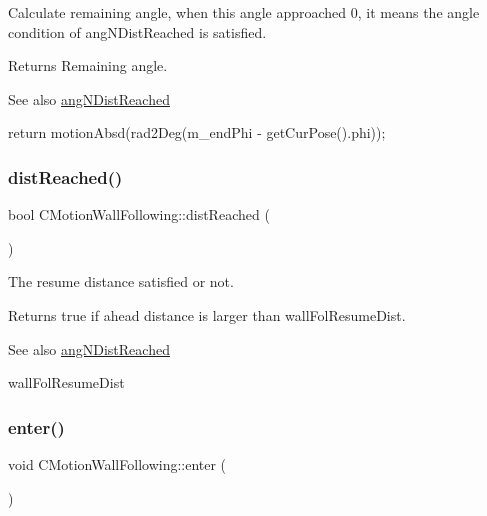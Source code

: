 Calculate remaining angle, when this angle approached 0, it means the angle condition of ang\+N\+Dist\+Reached is satisfied. \begin{DoxyReturn}{Returns}
Remaining angle. 
\end{DoxyReturn}
\begin{DoxySeeAlso}{See also}
\mbox{\hyperlink{classmotion_1_1CMotionWallFollowing_aa84fb18a4cea89ad726c18d4f308e4d7}{ang\+N\+Dist\+Reached}} 
\end{DoxySeeAlso}
return motion\+Absd(rad2\+Deg(m\+\_\+end\+Phi -\/ get\+Cur\+Pose().phi)); \mbox{\label{classmotion_1_1CMotionWallFollowing_a4fcea1525cdd043f8c0dd8621e3ba09e}} 
\subsubsection{\texorpdfstring{dist\+Reached()}{distReached()}}
{\footnotesize\ttfamily bool C\+Motion\+Wall\+Following\+::dist\+Reached (\begin{DoxyParamCaption}\item[{void}]{ }\end{DoxyParamCaption})}

The resume distance satisfied or not. \begin{DoxyReturn}{Returns}
true if ahead distance is larger than wall\+Fol\+Resume\+Dist. 
\end{DoxyReturn}
\begin{DoxySeeAlso}{See also}
\mbox{\hyperlink{classmotion_1_1CMotionWallFollowing_aa84fb18a4cea89ad726c18d4f308e4d7}{ang\+N\+Dist\+Reached}} 

wall\+Fol\+Resume\+Dist 
\end{DoxySeeAlso}
\mbox{\label{classmotion_1_1CMotionWallFollowing_ad42584f648abe8826d2c23dad8128484}} 
\subsubsection{\texorpdfstring{enter()}{enter()}}
{\footnotesize\ttfamily void C\+Motion\+Wall\+Following\+::enter (\begin{DoxyParamCaption}\item[{\mbox{\hyperlink{classmotion_1_1CMotion}{C\+Motion}} $\ast$}]{ }\end{DoxyParamCaption})\hspace{0.3cm}{\ttfamily [virtual]}}

